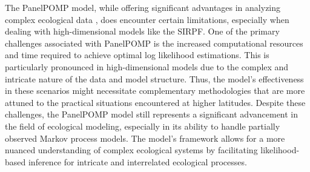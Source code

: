 \documentclass[12pt]{article}
\begin{document}
The PanelPOMP model, while offering significant advantages in analyzing complex ecological data \citep{Carles2020}, does encounter certain limitations, especially when dealing with high-dimensional models like the SIRPF. One of the primary challenges associated with PanelPOMP is the increased computational resources and time required to achieve optimal log likelihood estimations. This is particularly pronounced in high-dimensional models due to the complex and intricate nature of the data and model structure. Thus, the model's effectiveness in these scenarios might necessitate complementary methodologies that are more attuned to the practical situations encountered at higher latitudes. Despite these challenges, the PanelPOMP model still represents a significant advancement in the field of ecological modeling, especially in its ability to handle partially observed Markov process models. The model's framework allows for a more nuanced understanding of complex ecological systems by facilitating likelihood-based inference for intricate and interrelated ecological processes.\\




\end{document}
